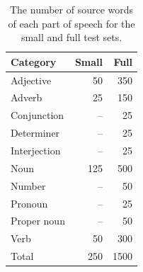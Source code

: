\documentclass[11pt]{article}
\begin{document}
\begin{table}
    \centering
    \small
    \begin{tabular}{lrr}
        \toprule
        Category & Small & Full \\
        \midrule
        Adjective     & 50  & 350 \\
        Adverb        & 25  & 150 \\
        Conjunction   & --  & 25  \\
        Determiner    & --  & 25  \\
        Interjection  & --  & 25  \\
        Noun          & 125 & 500 \\
        Number        & --  & 50  \\
        Pronoun       & --  & 25  \\
        Proper noun   & --  & 50  \\
        Verb          & 50  & 300 \\
        \midrule
        Total         & 250 & 1500 \\
        \bottomrule
    \end{tabular}
    \caption{
        The number of source words of each part of speech for the small and full test sets.
    }
    \label{table:test_pos}
\end{table}
\end{document}
